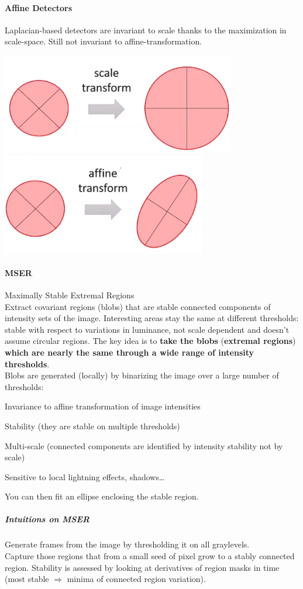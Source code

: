 \documentclass[10pt]{report}
\begin{document}
\paragraph{Affine Detectors} Laplacian-based detectors are invariant to scale thanks to the maximization in scale-space. Still not invariant to affine-transformation.
\begin{center}
	\includegraphics[scale=0.5]{7.png}\\
	\includegraphics[scale=0.5]{8.png}
\end{center}
\paragraph{MSER} Maximally Stable Extremal Regions\\
Extract covariant regions (blobs) that are stable connected components of intensity sets of the image. Interesting areas stay the same at different thresholds: stable with respect to variations in luminance, not scale dependent and doesn't assume circular regions. The key idea is to \textbf{take the blobs} (\textbf{extremal regions}) \textbf{which are nearly the same through a wide range of intensity thresholds}.\\
Blobs are generated (locally) by binarizing the image over a large number of thresholds:\begin{list}{}{}
	\item Invariance to affine transformation of image intensities
	\item Stability (they are stable on multiple thresholds)
	\item Multi-scale (connected components are identified by intensity stability not by scale)
	\item Sensitive to local lightning effects, shadows\ldots
\end{list}
You can then fit an ellipse enclosing the stable region.
\subparagraph{Intuitions on MSER} Generate frames from the image by thresholding it on all graylevels.\\
Capture those regions that from a small seed of pixel grow to a stably connected region. Stability is assessed by looking at derivatives of region masks in time (most stable $\Rightarrow$ minima of connected region variation).
\end{document}
